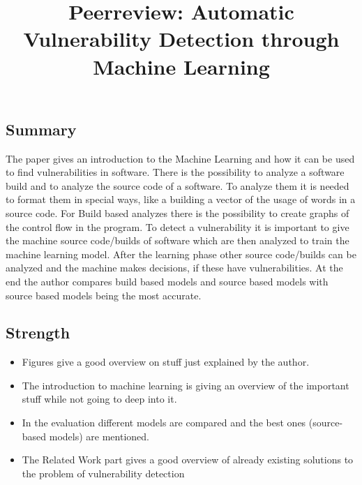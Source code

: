 \documentclass[peerreview, 10pt, onecolumn]{IEEEtran}
\begin{document}
\title{Peerreview: Automatic Vulnerability Detection through Machine Learning}

\author{}

\IEEEpeerreviewmaketitle

\subsection*{Summary}
    The paper gives an introduction to the Machine Learning and how it can be used to find vulnerabilities in software.
    There is the possibility to analyze a software build and to analyze the source code of a software. 
    To analyze them it is needed to format them in special ways, like a building a vector of the usage of words in a source code.
    For Build based analyzes there is the possibility to create graphs of the control flow in the program.
    To detect a vulnerability it is important to give the machine source code/builds of software which are then analyzed to train the machine learning model.
    After the learning phase other source code/builds can be analyzed and the machine makes decisions, if these have vulnerabilities.
    At the end the author compares build based models and source based models with source based models being the most accurate.
\subsection*{Strength}
    \begin{itemize}
        \renewcommand\labelitemi{+}
        \item Figures give a good overview on stuff just explained by the author.
        \item The introduction to machine learning is giving an overview of the important stuff while not going to deep into it.
        \item In the evaluation different models are compared and the best ones (source-based models) are mentioned. 
        \item The Related Work part gives a good overview of already existing solutions to the problem of vulnerability detection
    \end{itemize}
\end{document}
